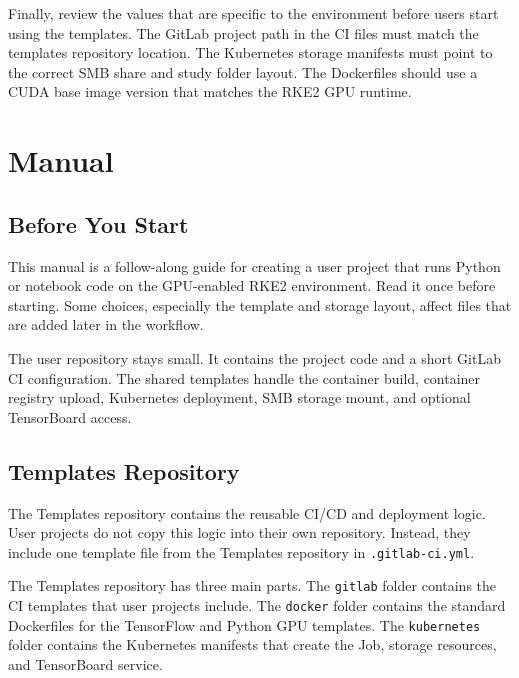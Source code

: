 \documentclass{article}
\begin{document}
\vspace{0.5cm}

Finally, review the values that are specific to the environment before users start using the templates. The GitLab project path in the CI files must match the templates repository location. The Kubernetes storage manifests must point to the correct SMB share and study folder layout. The Dockerfiles should use a CUDA base image version that matches the RKE2 GPU runtime.

\newpage
\section{Manual}
\subsection{Before You Start}

This manual is a follow-along guide for creating a user project that runs Python or notebook code on the GPU-enabled RKE2 environment. Read it once before starting. Some choices, especially the template and storage layout, affect files that are added later in the workflow.

\vspace{0.5cm}

The user repository stays small. It contains the project code and a short GitLab CI configuration. The shared templates handle the container build, container registry upload, Kubernetes deployment, SMB storage mount, and optional TensorBoard access.

\subsection{Templates Repository}

The Templates repository contains the reusable CI/CD and deployment logic. User projects do not copy this logic into their own repository. Instead, they include one template file from the Templates repository in \texttt{.gitlab-ci.yml}.

\vspace{0.5cm}

The Templates repository has three main parts. The \texttt{gitlab} folder contains the CI templates that user projects include. The \texttt{docker} folder contains the standard Dockerfiles for the TensorFlow and Python GPU templates. The \texttt{kubernetes} folder contains the Kubernetes manifests that create the Job, storage resources, and TensorBoard service.
\end{document}
